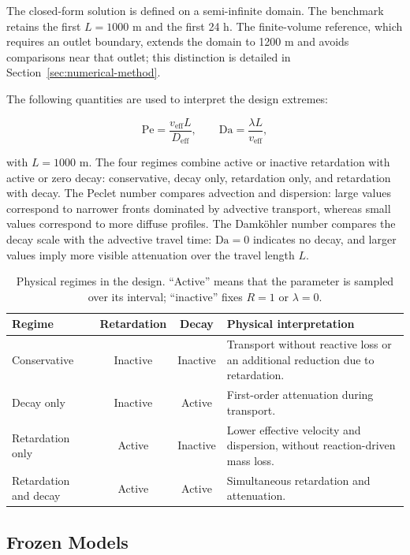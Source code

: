 \documentclass[11pt,a4paper]{article}
\begin{document}
The closed-form solution is defined on a semi-infinite domain. The benchmark
retains the first $L=1000$ m and the first 24 h. The finite-volume reference,
which requires an outlet boundary, extends the domain to 1200 m and avoids
comparisons near that outlet; this distinction is detailed in
Section~\ref{sec:numerical-method}.

The following quantities are used to interpret the design extremes:

\begin{equation}
\mathrm{Pe}=\frac{v_{\mathrm{eff}}L}{D_{\mathrm{eff}}},
\qquad
\mathrm{Da}=\frac{\lambda L}{v_{\mathrm{eff}}},
\end{equation}

with $L=1000$ m. The four regimes combine active or inactive retardation with
active or zero decay: conservative, decay only, retardation only, and
retardation with decay. The Peclet number compares advection and dispersion:
large values correspond to narrower fronts dominated by advective transport,
whereas small values correspond to more diffuse profiles. The Damköhler number
compares the decay scale with the advective travel time: $\mathrm{Da}=0$
indicates no decay, and larger values imply more visible attenuation over the
travel length $L$.

\begin{table}[htbp]
\centering
\caption{Physical regimes in the design. ``Active'' means that the parameter is
sampled over its interval; ``inactive'' fixes $R=1$ or $\lambda=0$.}
\label{tab:regimes}
\small
\begin{tabularx}{\textwidth}{@{}YccY@{}}
\toprule
Regime & Retardation & Decay & Physical interpretation \\
\midrule
Conservative & Inactive & Inactive & Transport without reactive loss or an
additional reduction due to retardation. \\
Decay only & Inactive & Active & First-order attenuation during transport. \\
Retardation only & Active & Inactive & Lower effective velocity and dispersion,
without reaction-driven mass loss. \\
Retardation and decay & Active & Active & Simultaneous retardation and
attenuation. \\
\bottomrule
\end{tabularx}
\end{table}

\subsection{Frozen Models}
\end{document}

